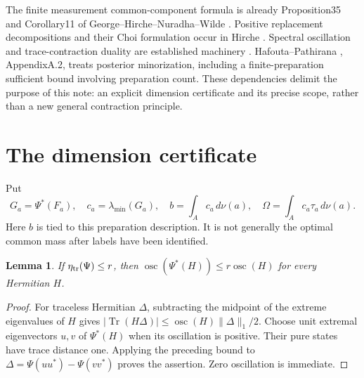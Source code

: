 \documentclass[11pt]{article}
\newtheorem{lemma}[theorem]{Lemma}
\newcommand{\Tr}{\operatorname{Tr}}
\newcommand{\osc}{\operatorname{osc}}
\begin{document}
The finite measurement common-component formula is already Proposition35 and Corollary11 of George--Hirche--Nuradha--Wilde \cite{GHNW}. Positive replacement decompositions and their Choi formulation occur in Hirche \cite{Hirche}. Spectral oscillation and trace-contraction duality are established machinery \cite{GQ}. Hafouta--Pathirana \cite{HP}, AppendixA.2, treats posterior minorization, including a finite-preparation sufficient bound involving preparation count. These dependencies delimit the purpose of this note: an explicit dimension certificate and its precise scope, rather than a new general contraction principle.

\section{The dimension certificate}
Put
\begin{equation}\label{components}
 G_a=\Psi^*(F_a),\quad c_a=\lambda_{\min}(G_a),\quad
 b=\int_A c_a\,d\nu(a),\quad \Omega=\int_A c_a\tau_a\,d\nu(a).
\end{equation}
Here $b$ is tied to this preparation description. It is not generally the optimal common mass after labels have been identified.

\begin{lemma}\label{osc}
If $\eta_{\rm tr}(\Psi)\le r$, then
$\osc(\Psi^*(H))\le r\osc(H)$ for every Hermitian $H$.
\end{lemma}
\begin{proof}
For traceless Hermitian $\Delta$, subtracting the midpoint of the extreme eigenvalues of $H$ gives
$|\Tr(H\Delta)|\le \osc(H)\|\Delta\|_1/2$.
Choose unit extremal eigenvectors $u,v$ of $\Psi^*(H)$ when its oscillation is positive. Their pure states have trace distance one. Applying the preceding bound to
$\Delta=\Psi(uu^*)-\Psi(vv^*)$ proves the assertion. Zero oscillation is immediate.
\end{proof}
\end{document}
